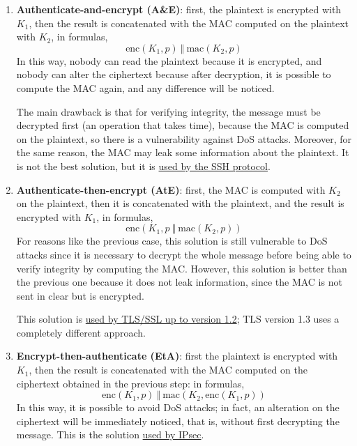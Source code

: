 \begin{enumerate}
	\item \textbf{Authenticate-and-encrypt (A\&E)}: first, the plaintext is encrypted with \(K_1\), then the result is concatenated with the MAC computed on the plaintext with \(K_2\), in formulas,
	      \[\text{enc}(K_1, p)\ \Vert \  \text{mac}(K_2, p)\]
	      In this way, nobody can read the plaintext because it is encrypted, and nobody can alter the ciphertext because after decryption, it is possible to compute the MAC again, and any difference will be noticed.

	      The main drawback is that for verifying integrity, the message must be decrypted first (an operation that takes time), because the MAC is computed on the plaintext, so there is a vulnerability against DoS attacks. Moreover, for the same reason, the MAC may leak some information about the plaintext. It is not the best solution, but it is \ul{used by the SSH protocol}.

	\item \textbf{Authenticate-then-encrypt (AtE)}: first, the MAC is computed with \(K_2\) on the plaintext, then it is concatenated with the plaintext, and the result is encrypted with \(K_1\), in formulas, \[\text{enc}(K_1, p \ \Vert \ \text{mac}(K_2, p))\]
	      For reasons like the previous case, this solution is still vulnerable to DoS attacks since it is necessary to decrypt the whole message before being able to verify integrity by computing the MAC. However, this solution is better than the previous one because it does not leak information, since the MAC is not sent in clear but is encrypted.

	      This solution is \underline{used by TLS/SSL up to version 1.2}; TLS version 1.3 uses a completely different approach.

	\item \textbf{Encrypt-then-authenticate (EtA)}: first the plaintext is encrypted with \(K_1\), then the result is
	      concatenated with the MAC computed on the ciphertext obtained in the previous step: in formulas,
	      \[\text{enc}(K_1, p) \ \Vert \ \text{mac}(K_2, \text{enc}(K_1, p))\]
	      In this way, it is possible to avoid DoS attacks; in fact, an alteration on the ciphertext will be immediately noticed, that is, without first decrypting the message.
	      This is the solution \underline{used by IPsec}.
\end{enumerate}

